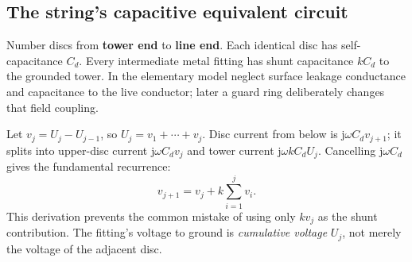 \documentclass[11pt,a4paper]{article}
\newcommand{\ans}[1]{\boxed{#1}}
\newcommand{\jj}{\mathrm j}
\begin{document}
\subsection{The string's capacitive equivalent circuit}
Number discs from \textbf{tower end} to \textbf{line end}. Each identical disc has self-capacitance $C_d$. Every intermediate metal fitting has shunt capacitance $kC_d$ to the grounded tower. In the elementary model neglect surface leakage conductance and capacitance to the live conductor; later a guard ring deliberately changes that field coupling.
\begin{center}
\end{center}
Let $v_j=U_j-U_{j-1}$, so $U_j=v_1+\cdots+v_j$. Disc current from below is $\jj\omega C_d v_{j+1}$; it splits into upper-disc current $\jj\omega C_dv_j$ and tower current $\jj\omega kC_dU_j$. Cancelling $\jj\omega C_d$ gives the fundamental recurrence:
\[
 \ans{v_{j+1}=v_j+k\sum_{i=1}^{j}v_i}.
\]
This derivation prevents the common mistake of using only $kv_j$ as the shunt contribution. The fitting's voltage to ground is \emph{cumulative voltage} $U_j$, not merely the voltage of the adjacent disc.
\end{document}
